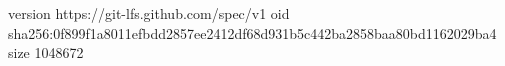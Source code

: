 version https://git-lfs.github.com/spec/v1
oid sha256:0f899f1a8011efbdd2857ee2412df68d931b5c442ba2858baa80bd1162029ba4
size 1048672
